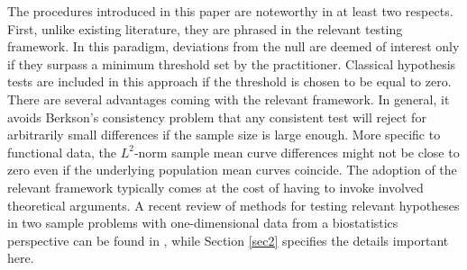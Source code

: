 \documentclass[11pt]{article}
\numberwithin{equation}{section}
\numberwithin{theorem}{section}
\numberwithin{lemma}{section}
\numberwithin{proposition}{section}
\numberwithin{cor}{section}
\numberwithin{definition}{section}
\numberwithin{cons}{section}
\numberwithin{rem}{section}
\numberwithin{exa}{section}
\numberwithin{table}{section}
\numberwithin{figure}{section}
\numberwithin{algo}{section}
\begin{document}
{{The procedures introduced in this paper  are noteworthy in at least two respects. First, unlike existing literature, they are phrased in the relevant testing framework. In this paradigm, deviations from the null are deemed of interest only if they surpass a minimum threshold set by the practitioner. Classical hypothesis tests are included in this approach if the threshold is chosen to be equal to zero. There are several advantages coming with the relevant framework. In general, it avoids Berkson's consistency problem \citep{berkson} that any consistent test will reject for arbitrarily small differences if the sample size is large enough. More specific to functional data, the $L^2$-norm sample mean curve differences might not be close to zero even if the underlying population mean curves coincide. The adoption of the relevant framework typically comes at the cost of having to invoke involved theoretical arguments.  {A recent review of  methods for testing  relevant hypotheses in  two sample problems  with   one-dimensional  data from a biostatistics perspective can be  found in \citet{wellek}, while Section \ref{sec2} specifies the details important here.}

}}
\end{document}
